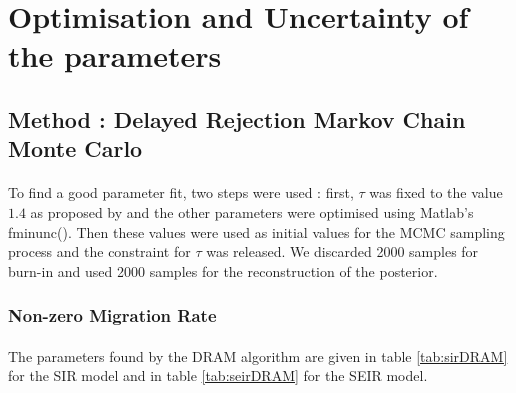 \documentclass[11pt, a4paper]{article}
\begin{document}
\section{Optimisation and Uncertainty of the parameters}

\subsection{Method : Delayed Rejection Markov Chain Monte Carlo}
\paragraph{}
To find a good parameter fit, two steps were used : first, $\tau$ was fixed to the value $1.4$ as proposed by \cite{coelho2011bayesian} and the other parameters were optimised using Matlab's fminunc(). Then these values were used as initial values for the MCMC sampling process and the constraint for $\tau$ was released. We discarded 2000 samples for burn-in and used 2000 samples for the reconstruction of the posterior.

\subsubsection{Non-zero Migration Rate}
\paragraph{}
The parameters found by the DRAM algorithm are given in table \ref{tab:sirDRAM} for the SIR model and in table \ref{tab:seirDRAM} for the SEIR model.
\end{document}
